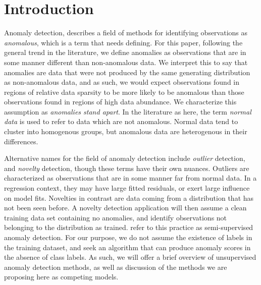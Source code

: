 \section{Introduction}

Anomaly detection, describes a field of methods for identifying observations as 
    \emph{anomalous}, which is a term that needs defining. For this paper, following 
    the general trend in the literature, we define anomalies as observations that 
    are in some manner different than non-anomalous data. We interpret 
    this to say that anomalies are data that were not produced by the same 
    generating distribution as non-anomalous data, and as such, we would expect 
    observations found in regions of relative data sparsity to be more likely to 
    be anomalous than those observations found in regions of high data 
    abundance.  We characterize this assumption as \emph{anomalies stand apart}.
    In the literature as here, the term \emph{normal data} is used to refer to data 
    which are not anomalous.  Normal data tend to cluster into homogenous groups, 
    but anomalous data are heterogenous in their differences. 
    
Alternative names for the field of anomaly detection include \emph{outlier} detection, and 
    \emph{novelty} detection, though these terms have their own nuances.
    Outliers are characterized as observations that are in some manner 
    far from normal data.  In a regression context, they may have
    large fitted residuals, or exert large influence on model fits.  Novelties
    in contrast are data coming from a distribution that has not been seen
    before.  A novelty detection application will then assume a clean 
    training data set containing no anomalies, and identify observations not
    belonging to the distribution as trained.  \cite{Chandola2009} refer to 
    this practice as semi-supervised anomaly detection. For our purpose, we do 
    not assume the existence of labels in the training 
    dataset, and seek an algorithm that can produce anomaly scores in the absence 
    of class labels. As such, we will offer a brief overview of unsupervised 
    anomaly detection methods, as well as discussion of the methods we are 
    proposing here as competing models.
    
